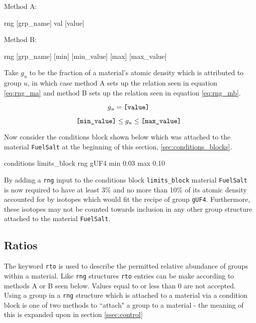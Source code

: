 \noindent Method A:

\begin{lt}
rng [grp_name] val [value]
\end{lt}

\noindent Method B:

\begin{lt}
rng [grp_name] [min] [min_value] [max] [max_value]
\end{lt}

Take $g_{u}$ to be the fraction of a material's atomic density which is 
attributed to group $u$, in which case method A sets up the relation seen in
equation \ref{eq:rng_ma} and method B sets up the relation seen in equation
\ref{eq:rng_mb}.


\begin{equation}\label{eq:rng_ma}
g_{u} = \text{\texttt{[value]}}
\end{equation}

\begin{equation}\label{eq:rng_mb}
\text{\texttt{[min\_value]}} \leq g_{u} \leq \text{\texttt{[max\_value]}}
\end{equation}

Now consider the conditions block shown below which was attached to the
material \texttt{FuelSalt} at the beginning of this section, 
\ref{sec:conditions_blocks}.

\begin{li}
conditions limits_block
rng gUF4    min 0.03    max 0.10
\end{li}

By adding a \texttt{rng} input to the conditions block \texttt{limits\_block}
material \texttt{FuelSalt} is now required to have at least 3\% and no more 
than 10\%
of its atomic density accounted for by isotopes which would fit the recipe
of group \texttt{gUF4}. Furthermore, these isotopes may not be counted towards
inclusion in any other group structure attached to the material
\texttt{FuelSalt}.

\subsection{Ratios}\label{ssec:ratios}
The keyword \texttt{rto} is used to describe the permitted relative abundance
of groups within a material. Like \texttt{rng} structures \texttt{rto} entries
can be make according to methods A or B seen below. Values equal to or less than
0 are not accepted. 
Using a group in a \texttt{rng} structure which is attached
to a material via a condition block is one of two methods to ``attach" a group
to a material - the meaning of this is expanded upon in section 
\ref{ssec:control}

